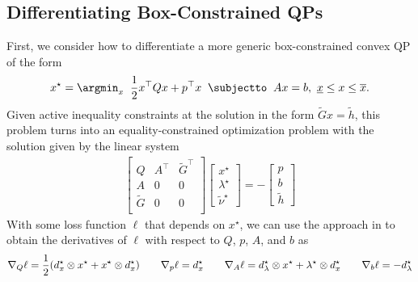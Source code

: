 \subsection{Differentiating Box-Constrained QPs}
First, we consider how to differentiate a more generic
box-constrained convex QP of the form
\begin{equation}
  \label{eq:empc:box_qp}
  x^\star =  \argmin_x \;\; \frac{1}{2} x^\top  Q x + p^\top  x \;\;
  \subjectto\;\; Ax = b, \
  \underline{x} \leq x \leq \overline{x}.
\end{equation}
Given active inequality constraints at the solution
in the form $\tilde Gx = \tilde h$,
this problem turns into an equality-constrained
optimization problem with the solution given
by the linear system
\begin{align}
  \label{eq:empc:qp_active_solve}
  \begin{bmatrix}
    Q & A^\top  & \tilde G^\top  \\
    A & 0 & 0 \\
    \tilde G & 0 & 0 \\
  \end{bmatrix}
  \begin{bmatrix}
    x^\star \\ \lambda^\star \\ \tilde \nu^\star
  \end{bmatrix}
  = -
  \begin{bmatrix}
      p \\ b \\ \tilde h
  \end{bmatrix}
\end{align}
With some loss function $\ell$ that depends on $x^\star$,
we can use the approach in \citet{amos2017optnet}
to obtain the derivatives of $\ell$ with respect
to $Q$, $p$, $A$, and $b$ as
\begin{equation}
  \label{eq:empc:qp_derivatives}
    \nabla_Q \ell =
      \frac{1}{2}(d_x^\star \otimes x^\star + x^\star \otimes d_x^\star) \qquad
    \nabla_p \ell = d_x^\star \qquad
    \nabla_A \ell =
      d_\lambda^\star \otimes x^\star + \lambda^\star \otimes d_x^\star \qquad
    \nabla_b \ell = -d_\lambda^\star \\
\end{equation}
